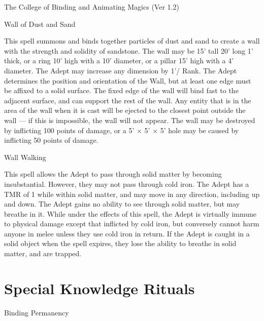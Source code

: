 \begin{Chapter}{The College of Binding and Animating Magics (Ver 1.2)}
\begin{spell}[S-12]{Wall of Dust and Sand}
\begin{effects}
This spell summons and binds together particles of dust and sand to
create a wall with the strength and solidity of sandstone. The wall
may be 15’ tall 20’ long 1’ thick, or a ring 10’ high with a 10’
diameter, or a pillar 15’ high with a 4’ diameter.  The Adept may
increase any dimension by 1’/ Rank.  The Adept determines the position
and orientation of the Wall, but at least one edge must be affixed to
a solid surface.  The fixed edge of the wall will bind fast to the
adjacent surface, and can support the rest of the wall. Any entity
that is in the area of the wall when it is cast will be ejected to the
closest point outside the wall — if this is impossible, the wall will
not appear. The wall may be destroyed by inflicting 100 points of
damage, or a 5’ × 5’ × 5’ hole may be caused by inflicting 50 points
of damage.
\end{effects}
\end{spell}

\begin{spell}[S-13]{Wall Walking }
\begin{effects}
This spell allows the Adept to pass through solid matter by becoming
insubstantial.  However, they may not pass through cold iron.  The
Adept has a TMR of 1 while within solid matter, and may move in any
direction, including up and down. The Adept gains no ability to see
through solid matter, but may breathe in it.  While under the effects
of this spell, the Adept is virtually immune to physical damage except
that inflicted by cold iron, but conversely cannot harm anyone in
melee unless they use cold iron in return. If the Adept is caught in a
solid object when the spell expires, they lose the ability to breathe
in solid matter, and are trapped.
\end{effects}
\end{spell}


\section{Special Knowledge Rituals}

\begin{ritual}[R-1]{Binding Permanency }


\end{ritual}
\end{Chapter}
